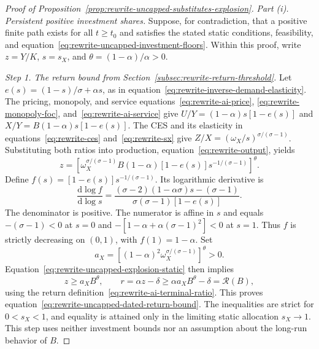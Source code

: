 \begin{proof}[Proof of Proposition~\ref{prop:rewrite-uncapped-substitutes-explosion}]
\label{proof:rewrite-uncapped-substitutes-explosion}
\textit{Part (i). Persistent positive investment shares.}
Suppose, for contradiction, that a positive finite path exists for all
$t\geq t_0$ and satisfies the stated static conditions, feasibility, and
equation~\eqref{eq:rewrite-uncapped-investment-floors}. Within this proof,
write $z=Y/K$, $s=s_X$, and $\theta=(1-\alpha)/\alpha>0$.

\textit{Step 1. The return bound from Section~\ref{subsec:rewrite-return-threshold}.}
Let $e(s)=(1-s)/\sigma+\alpha s$, as in
equation~\eqref{eq:rewrite-inverse-demand-elasticity}. The pricing,
monopoly, and service equations~\eqref{eq:rewrite-ai-price},
\eqref{eq:rewrite-monopoly-foc}, and~\eqref{eq:rewrite-ai-service} give
$U/Y=(1-\alpha)s[1-e(s)]$ and $X/Y=B(1-\alpha)s[1-e(s)]$.
The CES and its elasticity in equations~\eqref{eq:rewrite-ces}
and~\eqref{eq:rewrite-sx} give
$Z/X=(\omega_X/s)^{\sigma/(\sigma-1)}$. Substituting both ratios into
production, equation~\eqref{eq:rewrite-output}, yields
\begin{equation}
 z=\left[
 \omega_X^{\sigma/(\sigma-1)}B(1-\alpha)[1-e(s)]
 s^{-1/(\sigma-1)}\right]^\theta.
 \label{eq:rewrite-uncapped-explosion-static}
\end{equation}
Define $f(s)=[1-e(s)]s^{-1/(\sigma-1)}$. Its logarithmic derivative is
\[
 \frac{\mathrm d\log f}{\mathrm d\log s}
 =\frac{(\sigma-2)(1-\alpha\sigma)s-(\sigma-1)}
 {\sigma(\sigma-1)[1-e(s)]}.
\]
The denominator is positive. The numerator is affine in $s$ and equals
$-(\sigma-1)<0$ at $s=0$ and
$-[1-\alpha+\alpha(\sigma-1)^2]<0$ at $s=1$. Thus $f$ is strictly
decreasing on $(0,1)$, with $f(1)=1-\alpha$. Set
\[
 a_X=\left[(1-\alpha)^2\omega_X^{\sigma/(\sigma-1)}\right]^\theta>0.
\]
Equation~\eqref{eq:rewrite-uncapped-explosion-static} then implies
\begin{equation}
 z\geq a_XB^\theta,\qquad
 r=\alpha z-\delta\geq\alpha a_XB^\theta-\delta=\mathcal R(B),
 \label{eq:rewrite-uncapped-output-capital-bound}
\end{equation}
using the return definition~\eqref{eq:rewrite-ai-terminal-ratio}.
This proves equation~\eqref{eq:rewrite-uncapped-dated-return-bound}.
The inequalities are strict for $0<s_X<1$, and equality is attained only
in the limiting static allocation $s_X\to1$. This step uses neither
investment bounds nor an assumption about the long-run behavior of $B$.


\end{proof}

